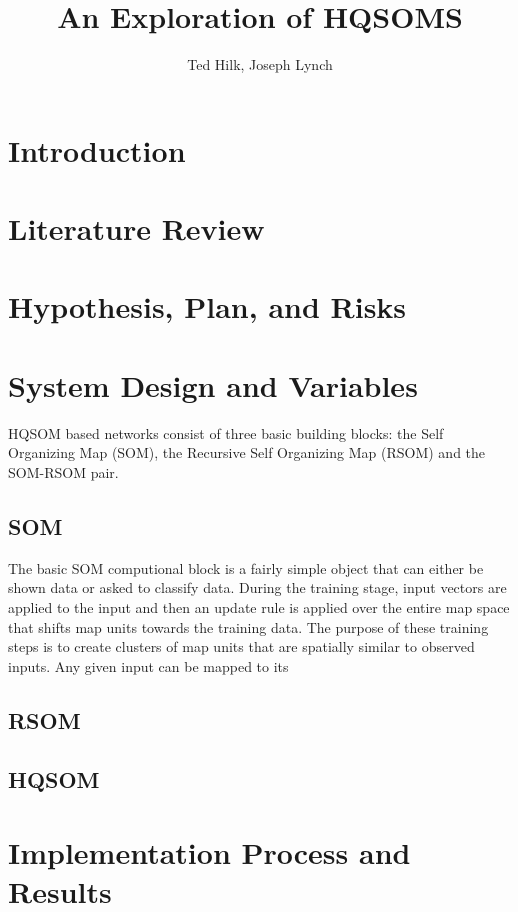\documentclass[a4paper,10pt]{article}
\title{An Exploration of HQSOMS}
\author{Ted Hilk, Joseph Lynch}
\begin{document}
\maketitle

\begin{abstract}

\end{abstract}

\section{Introduction}
\section{Literature Review}
\section{Hypothesis, Plan, and Risks}
\section{System Design and Variables}
HQSOM based networks consist of three basic building blocks: the Self Organizing Map (SOM), the
Recursive Self Organizing Map (RSOM) and the SOM-RSOM pair. 
\subsection{SOM}
The basic SOM computional block is a fairly simple object that can either be shown data or asked to
classify data. During the training stage, input vectors are applied to the input and then an
update rule is applied over the entire map space that shifts map units towards the training data. 
The purpose of these training steps is to create clusters of map units that are spatially similar to
observed inputs.  Any given input can be mapped to its  
\subsection{RSOM}
\subsection{HQSOM}

\section{Implementation Process and Results}
\end{document}
